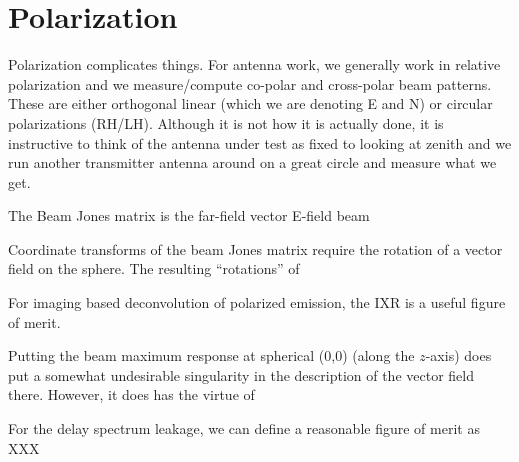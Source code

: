 \section{Polarization}

Polarization complicates things.  For antenna work, we generally work in relative polarization and we measure/compute co-polar and cross-polar beam patterns.  These are either orthogonal linear (which we are denoting E and N) or circular polarizations (RH/LH).
Although it is not how it is actually done, it is instructive to think of the antenna under test as fixed to looking at zenith and we run another transmitter antenna around on a great circle and measure what we get.

The Beam Jones matrix is the far-field vector E-field beam

Coordinate transforms of the beam Jones matrix require the rotation of a vector field on the sphere.  The resulting ``rotations'' of 

For imaging based deconvolution of polarized emission, the IXR is a useful figure of merit.

Putting the beam maximum response at spherical (0,0) (along the $z$-axis) does put a somewhat undesirable singularity in the description of the vector field there.  However, it does has the virtue of 

For the delay spectrum leakage, we can define a reasonable figure of merit as XXX